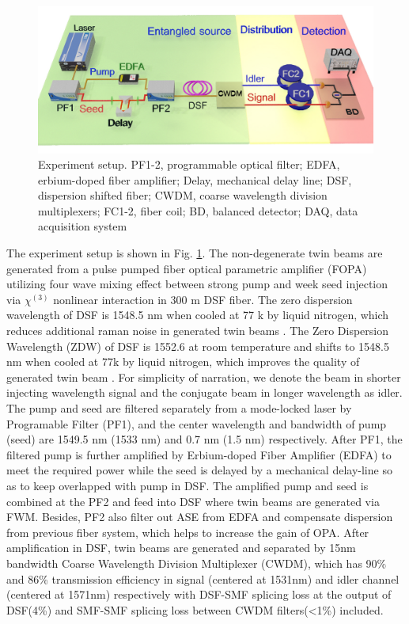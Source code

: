 \documentclass[9pt,twocolumn,twoside]{osajnl}
\begin{document}
\begin{figure}[htbp]
\centering
\includegraphics[width=\linewidth]{fig1_3d_2.jpg}
\caption{Experiment setup.
PF1-2, programmable optical filter;
EDFA, erbium-doped fiber amplifier;
Delay, mechanical delay line;
DSF, dispersion shifted fiber;
CWDM, coarse wavelength division multiplexers;
FC1-2, fiber coil;
BD, balanced detector;
DAQ, data acquisition system}
\label{fig_setup}

\end{figure}
The experiment setup is shown in Fig. \ref{fig_setup}.
The non-degenerate twin beams are generated from a pulse pumped fiber optical parametric amplifier (FOPA) utilizing four wave mixing effect between strong pump and week seed injection via \(\chi^{(3)} \) nonlinear interaction in 300 m DSF fiber.
The zero dispersion wavelength of DSF is 1548.5 nm when cooled at 77 k by liquid nitrogen, which reduces additional raman noise in generated twin beams \cite{guo12}.
The Zero Dispersion Wavelength (ZDW) of DSF is 1552.6 at room temperature and shifts to 1548.5 nm when cooled at 77k by liquid nitrogen, which improves the quality of generated twin beam \cite{guo12}.
For simplicity of narration, we denote the beam in shorter injecting wavelength signal and the conjugate beam in longer wavelength as idler.
The pump and seed are filtered separately from a mode-locked laser by Programable Filter (PF1), and the center wavelength and bandwidth of pump (seed) are 1549.5 nm (1533 nm) and 0.7 nm (1.5 nm) respectively.
After PF1, the filtered pump is further amplified by Erbium-doped Fiber Amplifier (EDFA) to meet the required power while the seed is delayed by a mechanical delay-line so as to keep overlapped with pump in DSF.
The amplified pump and seed is combined at the PF2 and feed into DSF where twin beams are generated via FWM.
Besides, PF2 also filter out ASE from EDFA and compensate dispersion from previous fiber system, which helps to increase the gain of OPA.
After amplification in DSF, twin beams are generated and separated by 15nm bandwidth Coarse Wavelength Division Multiplexer (CWDM), which has 90\% and 86\% transmission efficiency in signal (centered at 1531nm) and idler channel (centered at 1571nm)  respectively with DSF-SMF splicing loss at the output of DSF(4\%) and SMF-SMF splicing loss between CWDM filters(<1\%) included.
\end{document}
